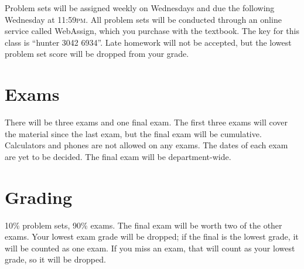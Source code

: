 \documentclass[11pt]{article}
\begin{document}
Problem sets will be assigned weekly on Wednesdays and due the following Wednesday at 11:59\textsc{pm}. 
All problem sets will be conducted through an online service called WebAssign, which you purchase with the textbook.
The key for this class is ``hunter 3042 6934''.
Late homework will not be accepted, but the lowest problem set score will be dropped from your grade.

\section{Exams}

There will be three exams and one final exam.
The first three exams will cover the material since the last exam,
but the final exam will be cumulative.
Calculators and phones are not allowed on any exams.
The dates of each exam are yet to be decided.
The final exam will be department-wide.

\section{Grading}

10\% problem sets, 90\% exams.
The final exam will be worth two of the other exams.
Your lowest exam grade will be dropped; if the final is the lowest grade, it will be counted as one exam.
If you miss an exam, that will count as your lowest grade, so it will be dropped.
\end{document}
